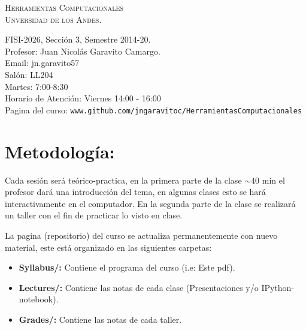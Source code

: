 \documentclass[letterpaper]{article}
\begin{document}
\begin{center}
\textsc{\LARGE Herramientas Computacionales}\\
\textsc{\large Unversidad de los Andes.}\\
\end{center}
\large{FISI-2026, Secci\'on 3, Semestre 2014-20.}\\
\large{Profesor: Juan Nicol\'as Garavito Camargo.}\\
\large{Email: jn.garavito57}\\
\large{Sal\'on: LL204}\\
\large{Martes: 7:00-8:30}\\
\large{Horario de Atenci\'on: Viernes 14:00 - 16:00}\\
\large{Pagina del curso: \verb"www.github.com/jngaravitoc/HerramientasComputacionales"}

\section*{Metodolog\'ia:}

Cada sesi\'on ser\'a te\'orico-practica, en la primera parte de la clase $\sim 40$ min el profesor 
dar\'a una introducci\'on del tema, en algunas clases esto se har\'a interactivamente en el computador. 
En la segunda parte de la clase se realizar\'a un taller con el fin de practicar
lo visto en clase.

La pagina (repositorio) del curso se actualiza permanentemente con nuevo material, este est\'a organizado en las siguientes carpetas:\\

\begin{itemize}
\item \textbf{Syllabus/:} Contiene el programa del curso (i.e: Este pdf).
\item \textbf{Lectures/:} Contiene las notas de cada clase (Presentaciones y/o IPython-notebook).
\item \textbf{Grades/:} Contiene las notas de cada taller.
\end{itemize}
 
 
\end{document}
